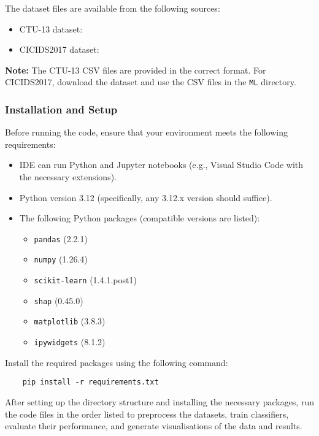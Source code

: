 The dataset files are available from the following sources:

\begin{itemize}
    \item CTU-13 dataset:~\cite{CTU13download}
    \item CICIDS2017 dataset:~\cite{CICIDS2017download}
\end{itemize}

\textbf{Note:} The CTU-13 CSV files are provided in the correct format. For CICIDS2017, download the dataset and use the CSV files in the \texttt{ML} directory.

\subsubsection{Installation and Setup}

Before running the code, ensure that your environment meets the following requirements:

\begin{itemize}
    \item IDE can run Python and Jupyter notebooks (e.g., Visual Studio Code with the necessary extensions).
    \item Python version 3.12 (specifically, any 3.12.x version should suffice).
    \item The following Python packages (compatible versions are listed):
    \begin{itemize}
        \item \texttt{pandas} (2.2.1)
        \item \texttt{numpy} (1.26.4)
        \item \texttt{scikit-learn} (1.4.1.post1)
        \item \texttt{shap} (0.45.0)
        \item \texttt{matplotlib} (3.8.3)
        \item \texttt{ipywidgets} (8.1.2)
    \end{itemize}
\end{itemize}

Install the required packages using the following command:

\begin{verbatim}
    pip install -r requirements.txt
\end{verbatim}

After setting up the directory structure and installing the necessary packages, run the code files in the order listed to preprocess the datasets, train classifiers, evaluate their performance, and generate visualisations of the data and results.
